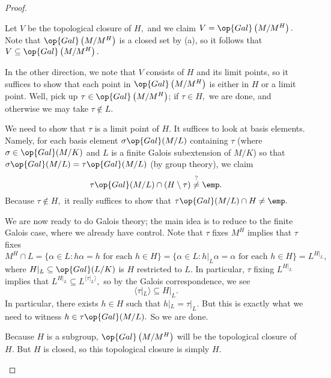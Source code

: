 \documentclass[../notes.tex]{subfiles}
\begin{document}
\begin{proof}
\begin{listalph}
		\item Let $V$ be the topological closure of $H,$ and we claim $V=\op{Gal}\left(M/M^H\right).$ Note that $\op{Gal}\left(M/M^H\right)$ is a closed set by (a), so it follows that $V\subseteq\op{Gal}\left(M/M^H\right).$

		In the other direction, we note that $V$ consists of $H$ and its limit points, so it suffices to show that each point in $\op{Gal}\left(M/M^H\right)$ is either in $H$ or a limit point. Well, pick up $\tau\in\op{Gal}\left(M/M^H\right)$; if $\tau\in H,$ we are done, and otherwise we may take $\tau\notin L.$

		We need to show that $\tau$ is a limit point of $H.$ It suffices to look at basis elements. Namely, for each basis element $\sigma\op{Gal}(M/L)$ containing $\tau$ (where $\sigma\in\op{Gal}(M/K)$ and $L$ is a finite Galois subextension of $M/K$) so that $\sigma\op{Gal}(M/L)=\tau\op{Gal}(M/L)$ (by group theory), we claim
		\[\tau\op{Gal}(M/L)\cap(H\setminus\tau)\stackrel?\ne\emp.\]
		Because $\tau\notin H,$ it really suffices to show that $\tau\op{Gal}(M/L)\cap H\ne\emp.$

		We are now ready to do Galois theory; the main idea is to reduce to the finite Galois case, where we already have control. Note that $\tau$ fixes $M^H$ implies that $\tau$ fixes
		\[M^H\cap L=\{\alpha\in L:h\alpha=h\text{ for each }h\in H\}=\{\alpha\in L:h|_L\alpha=\alpha\text{ for each }h\in H\}=L^{H|_L},\]
		where $H|_L\subseteq\op{Gal}(L/K)$ is $H$ restricted to $L.$ In particular, $\tau$ fixing $L^{H|_L}$ implies that $L^{H|_L}\subseteq L^{\langle\tau|_L\rangle},$ so by the Galois correspondence, we see
		\[\langle\tau|_L\rangle\subseteq H|_L.\]
		In particular, there exists $h\in H$ such that $h|_L=\tau|_L.$ But this is exactly what we need to witness $h\in\tau\op{Gal}(M/L).$ So we are done.

		\item Because $H$ is a subgroup, $\op{Gal}\left(M/M^H\right)$ will be the topological closure of $H.$ But $H$ is closed, so this topological closure is simply $H.$
		\qedhere
	\end{listalph}
\end{proof}


\end{document}
